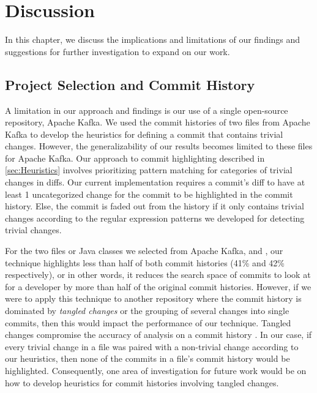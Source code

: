 \chapter{Discussion}
\label{ch:Discussion}


In this chapter, we discuss the implications and limitations of our findings 
and suggestions for further investigation to expand on our work.


\section{Project Selection and Commit History}

A limitation in our approach and findings is our use of a single open-source repository, Apache Kafka.
We used the commit histories of two files from Apache Kafka to develop the heuristics for defining a commit that contains trivial changes.
However, the generalizability of our results becomes limited to these files for Apache Kafka.
Our approach to commit highlighting described in \autoref{sec:Heuristics}
involves prioritizing pattern matching for categories of trivial changes in diffs.
Our current implementation requires a commit's diff to have at least 1 uncategorized change
for the commit to be highlighted in the commit history.
Else, the commit is faded out from the history if it only contains trivial changes according to the regular expression patterns
we developed for detecting trivial changes.

For the two files or Java classes we selected from Apache Kafka,
 and ,
our technique highlights less than half of both commit histories (41\% and 42\% respectively),
or in other words, it reduces the search space of commits to look at for a developer 
by more than half of the original commit histories.
However, if we were to apply this technique to another repository where the commit history is 
dominated by \emph{tangled changes} or the grouping of several changes into single commits, 
then this would impact the performance of our technique.
Tangled changes compromise the accuracy of analysis on a commit history \cite{herzig_tangled_2013}.
In our case, if every trivial change in a file was paired with a non-trivial change according to our heuristics,
then none of the commits in a file's commit history would be highlighted.
Consequently, one area of investigation for future work would be on how to
develop heuristics for commit histories involving tangled changes.

